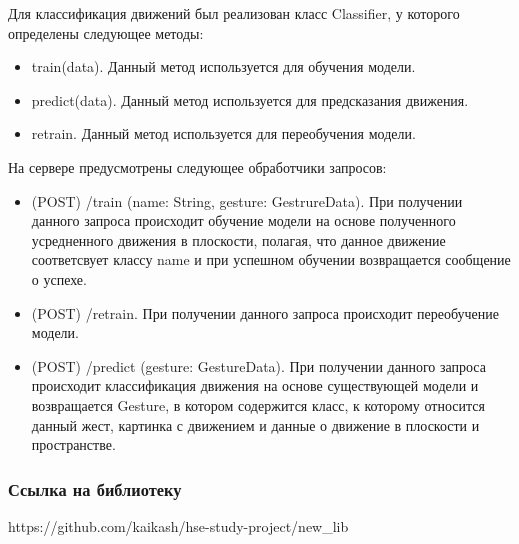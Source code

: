 Для классификация движений был реализован класс Classifier, у которого определены следующее методы:
\begin{itemize}
  \item train(data). Данный метод используется для обучения модели.
  \item predict(data). Данный метод используется для предсказания движения.
  \item retrain. Данный метод используется для переобучения модели.
\end{itemize}

На сервере предусмотрены следующее обработчики запросов:
\begin{itemize}
  \item (POST) /train (name: String, gesture: GestrureData). При получении данного запроса происходит обучение модели на основе полученного усредненного движения в плоскости, полагая, что данное движение соответсвует классу name и при успешном обучении возвращается сообщение о успехе.
  \item (POST) /retrain. При получении данного запроса происходит переобучение модели.

  \item (POST) /predict (gesture: GestureData). При получении данного запроса происходит классификация движения на основе существующей модели и возвращается Gesture, в котором содержится класс, к которому относится данный жест, картинка с движением и данные о движение в плоскости и пространстве.
\end{itemize}



\subsubsection{Ссылка на библиотеку}
https://github.com/kaikash/hse-study-project/new\_lib